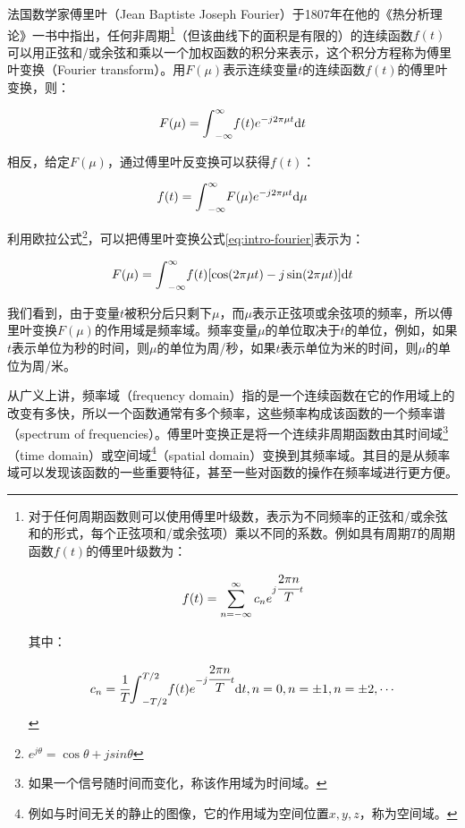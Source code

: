 法国数学家傅里叶（Jean Baptiste Joseph Fourier）于1807年在他的《热分析理论》一书中指出，任何非周期\footnote{对于任何周期函数则可以使用傅里叶级数，表示为不同频率的正弦和/或余弦和的形式，每个正弦项和/或余弦项）乘以不同的系数。例如具有周期$T$的周期函数$f(t)$的傅里叶级数为：

\begin{equation}\label{eq:fourier-series}
	f(t)=\sum^{\infty}_{n=-\infty}c_n e^{j \cfrac{2\pi n}{T}t}
\end{equation}

\noindent 其中：

\begin{equation}
	c_n= \cfrac{1}{T}{\rm \int}^{T/2}_{-T/2}f(t)e^{-j \cfrac{2\pi n}{T}t}{\rm d}t, n=0,n=\pm 1,n=\pm 2,\cdots
\end{equation}

}（但该曲线下的面积是有限的）的连续函数$f(t)$可以用正弦和/或余弦和乘以一个加权函数的积分来表示，这个积分方程称为傅里叶变换（Fourier transform）。用$F(\mu)$表示连续变量$t$的连续函数$f(t)$的傅里叶变换，则：

\begin{equation}\label{eq:intro-fourier}
	F(\mu)={\rm \int}^{\infty}_{-\infty}f(t)e^{-j2\pi\mu t}{\rm d}t
\end{equation}

\noindent 相反，给定$F(\mu)$，通过傅里叶反变换可以获得$f(t)$：

\begin{equation}
	f(t)={\rm \int}^{\infty}_{-\infty}F(\mu)e^{-j2\pi\mu t}{\rm d}\mu
\end{equation}

\noindent 利用欧拉公式\footnote{$e^{j\theta}=\cos\theta +jsin\theta$}，可以把傅里叶变换公式\ref{eq:intro-fourier}表示为：

\begin{equation}
	F(\mu)={\rm \int}^{\infty}_{-\infty}f(t)[\cos (2\pi\mu t)-j\sin(2\pi\mu t)]{\rm d}t
\end{equation}

\noindent 我们看到，由于变量$t$被积分后只剩下$\mu$，而$\mu$表示正弦项或余弦项的频率，所以傅里叶变换$F(\mu)$的作用域是频率域。频率变量$\mu$的单位取决于$t$的单位，例如，如果$t$表示单位为秒的时间，则$\mu$的单位为周/秒，如果$t$表示单位为米的时间，则$\mu$的单位为周/米。

从广义上讲，频率域（frequency domain）指的是一个连续函数在它的作用域上的改变有多快，所以一个函数通常有多个频率，这些频率构成该函数的一个频率谱（spectrum of frequencies）。傅里叶变换正是将一个连续非周期函数由其时间域\footnote{如果一个信号随时间而变化，称该作用域为时间域。}（time domain）或空间域\footnote{例如与时间无关的静止的图像，它的作用域为空间位置$x,y,z$，称为空间域。}（spatial domain）变换到其频率域。其目的是从频率域可以发现该函数的一些重要特征，甚至一些对函数的操作在频率域进行更方便。

